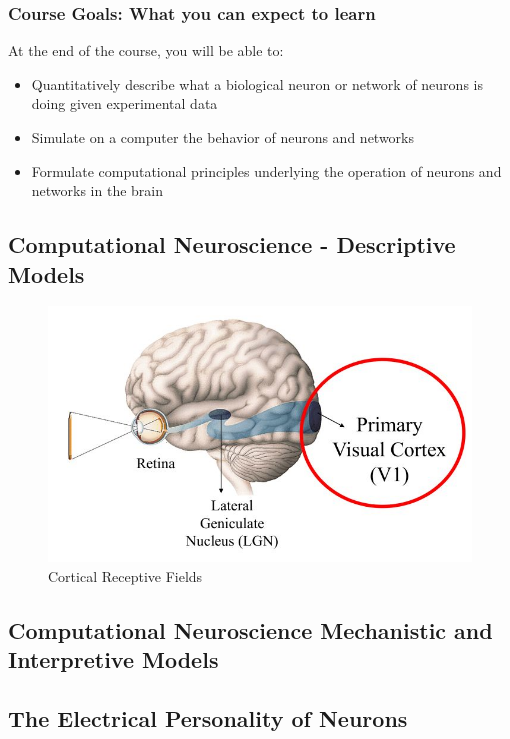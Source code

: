 \documentclass[]{article}
\begin{document}
\subsubsection{Course Goals: What you can expect to learn}
At the end of the course, you will be able to:
\begin{itemize}
	\item  Quantitatively describe what a biological neuron or
network of neurons is doing given experimental data
 \item Simulate on a computer the behavior of neurons and
networks
 \item Formulate computational principles underlying the
operation of neurons and networks in the brain
\end{itemize}

\subsection{Computational Neuroscience - Descriptive Models}


\begin{figure}[H]
	\caption{Cortical Receptive Fields}
	\includegraphics[width=\textwidth]{CorticalReceptive Fields}
\end{figure}

\subsection{Computational Neuroscience Mechanistic and Interpretive Models}

\subsection{The Electrical Personality of Neurons}
\end{document}

